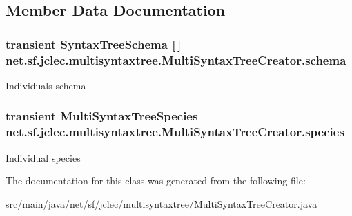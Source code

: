 \subsection{Member Data Documentation}
\hypertarget{classnet_1_1sf_1_1jclec_1_1multisyntaxtree_1_1_multi_syntax_tree_creator_a4bc639a3af236ba03a420fc2931305b1}{
\subsubsection[{schema}]{\setlength{\rightskip}{0pt plus 5cm}transient {\bf Syntax\-Tree\-Schema} \mbox{[}$\,$\mbox{]} net.\-sf.\-jclec.\-multisyntaxtree.\-Multi\-Syntax\-Tree\-Creator.\-schema\hspace{0.3cm}{\ttfamily [protected]}}}\label{classnet_1_1sf_1_1jclec_1_1multisyntaxtree_1_1_multi_syntax_tree_creator_a4bc639a3af236ba03a420fc2931305b1}
Individuals schema \hypertarget{classnet_1_1sf_1_1jclec_1_1multisyntaxtree_1_1_multi_syntax_tree_creator_a96aba485f9b41bd76f4215148db9d9cc}{
\subsubsection[{species}]{\setlength{\rightskip}{0pt plus 5cm}transient {\bf Multi\-Syntax\-Tree\-Species} net.\-sf.\-jclec.\-multisyntaxtree.\-Multi\-Syntax\-Tree\-Creator.\-species\hspace{0.3cm}{\ttfamily [protected]}}}\label{classnet_1_1sf_1_1jclec_1_1multisyntaxtree_1_1_multi_syntax_tree_creator_a96aba485f9b41bd76f4215148db9d9cc}
Individual species 

The documentation for this class was generated from the following file\-:\begin{DoxyCompactItemize}
\item 
src/main/java/net/sf/jclec/multisyntaxtree/Multi\-Syntax\-Tree\-Creator.\-java\end{DoxyCompactItemize}
